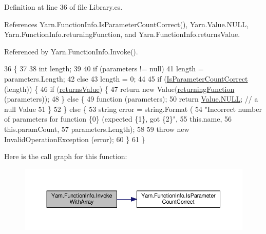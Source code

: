 Definition at line 36 of file Library.\-cs.



References Yarn.\-Function\-Info.\-Is\-Parameter\-Count\-Correct(), Yarn.\-Value.\-N\-U\-L\-L, Yarn.\-Function\-Info.\-returning\-Function, and Yarn.\-Function\-Info.\-returns\-Value.



Referenced by Yarn.\-Function\-Info.\-Invoke().


\begin{DoxyCode}
36                                                          \{
37 
38             \textcolor{keywordtype}{int} length;
39 
40             \textcolor{keywordflow}{if} (parameters != null)
41                 length = parameters.Length;
42             \textcolor{keywordflow}{else}
43                 length = 0;
44 
45             \textcolor{keywordflow}{if} (\hyperlink{a00096_a1ed09ff8aafa230a0d2bbc23cd6cd763}{IsParameterCountCorrect} (length)) \{
46                 \textcolor{keywordflow}{if} (\hyperlink{a00096_acaff044276aa230de7c0b27dd5267bc7}{returnsValue}) \{
47                     \textcolor{keywordflow}{return} \textcolor{keyword}{new} Value(\hyperlink{a00096_a8b6e0e5a875c427a1d947f3c52c308ca}{returningFunction} (parameters));
48                 \} \textcolor{keywordflow}{else} \{
49                     \textcolor{keyword}{function} (parameters);
50                     \textcolor{keywordflow}{return} \hyperlink{a00177_a1ed2964965baca8621c45efa23f37660}{Value.NULL}; \textcolor{comment}{// a null Value}
51                 \}
52             \} \textcolor{keywordflow}{else} \{
53                 \textcolor{keywordtype}{string} error = string.Format (
54                     \textcolor{stringliteral}{"Incorrect number of parameters for function \{0\} (expected \{1\}, got \{2\}"},
55                     this.name,
56                     this.paramCount,
57                     parameters.Length);
58 
59                 \textcolor{keywordflow}{throw} \textcolor{keyword}{new} InvalidOperationException (error);
60             \}
61         \}
\end{DoxyCode}


Here is the call graph for this function\-:
\nopagebreak
\begin{figure}[H]
\begin{center}
\leavevmode
\includegraphics[width=350pt]{a00096_a3ce11058d35232907a738de4bb094c67_cgraph}
\end{center}
\end{figure}




